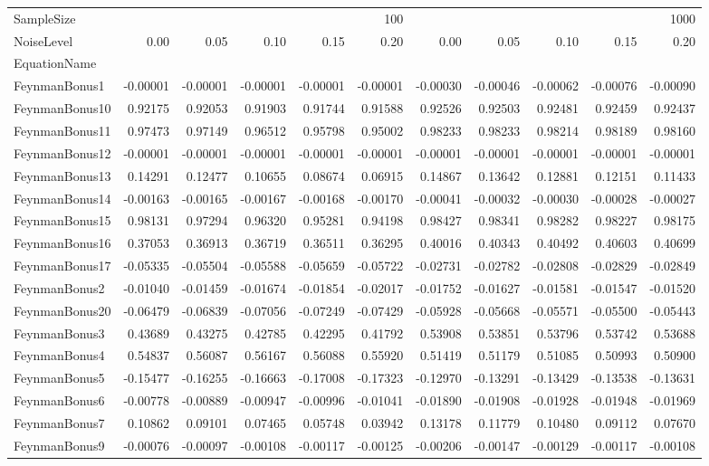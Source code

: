 \begin{tabular}{lrrrrrrrrrr}
\toprule
SampleSize & \multicolumn{5}{r}{100} & \multicolumn{5}{r}{1000} \\
NoiseLevel & 0.00 & 0.05 & 0.10 & 0.15 & 0.20 & 0.00 & 0.05 & 0.10 & 0.15 & 0.20 \\
EquationName &  &  &  &  &  &  &  &  &  &  \\
\midrule
FeynmanBonus1 & -0.00001 & -0.00001 & -0.00001 & -0.00001 & -0.00001 & -0.00030 & -0.00046 & -0.00062 & -0.00076 & -0.00090 \\
FeynmanBonus10 & 0.92175 & 0.92053 & 0.91903 & 0.91744 & 0.91588 & 0.92526 & 0.92503 & 0.92481 & 0.92459 & 0.92437 \\
FeynmanBonus11 & 0.97473 & 0.97149 & 0.96512 & 0.95798 & 0.95002 & 0.98233 & 0.98233 & 0.98214 & 0.98189 & 0.98160 \\
FeynmanBonus12 & -0.00001 & -0.00001 & -0.00001 & -0.00001 & -0.00001 & -0.00001 & -0.00001 & -0.00001 & -0.00001 & -0.00001 \\
FeynmanBonus13 & 0.14291 & 0.12477 & 0.10655 & 0.08674 & 0.06915 & 0.14867 & 0.13642 & 0.12881 & 0.12151 & 0.11433 \\
FeynmanBonus14 & -0.00163 & -0.00165 & -0.00167 & -0.00168 & -0.00170 & -0.00041 & -0.00032 & -0.00030 & -0.00028 & -0.00027 \\
FeynmanBonus15 & 0.98131 & 0.97294 & 0.96320 & 0.95281 & 0.94198 & 0.98427 & 0.98341 & 0.98282 & 0.98227 & 0.98175 \\
FeynmanBonus16 & 0.37053 & 0.36913 & 0.36719 & 0.36511 & 0.36295 & 0.40016 & 0.40343 & 0.40492 & 0.40603 & 0.40699 \\
FeynmanBonus17 & -0.05335 & -0.05504 & -0.05588 & -0.05659 & -0.05722 & -0.02731 & -0.02782 & -0.02808 & -0.02829 & -0.02849 \\
FeynmanBonus2 & -0.01040 & -0.01459 & -0.01674 & -0.01854 & -0.02017 & -0.01752 & -0.01627 & -0.01581 & -0.01547 & -0.01520 \\
FeynmanBonus20 & -0.06479 & -0.06839 & -0.07056 & -0.07249 & -0.07429 & -0.05928 & -0.05668 & -0.05571 & -0.05500 & -0.05443 \\
FeynmanBonus3 & 0.43689 & 0.43275 & 0.42785 & 0.42295 & 0.41792 & 0.53908 & 0.53851 & 0.53796 & 0.53742 & 0.53688 \\
FeynmanBonus4 & 0.54837 & 0.56087 & 0.56167 & 0.56088 & 0.55920 & 0.51419 & 0.51179 & 0.51085 & 0.50993 & 0.50900 \\
FeynmanBonus5 & -0.15477 & -0.16255 & -0.16663 & -0.17008 & -0.17323 & -0.12970 & -0.13291 & -0.13429 & -0.13538 & -0.13631 \\
FeynmanBonus6 & -0.00778 & -0.00889 & -0.00947 & -0.00996 & -0.01041 & -0.01890 & -0.01908 & -0.01928 & -0.01948 & -0.01969 \\
FeynmanBonus7 & 0.10862 & 0.09101 & 0.07465 & 0.05748 & 0.03942 & 0.13178 & 0.11779 & 0.10480 & 0.09112 & 0.07670 \\
FeynmanBonus9 & -0.00076 & -0.00097 & -0.00108 & -0.00117 & -0.00125 & -0.00206 & -0.00147 & -0.00129 & -0.00117 & -0.00108 \\
\bottomrule
\end{tabular}
